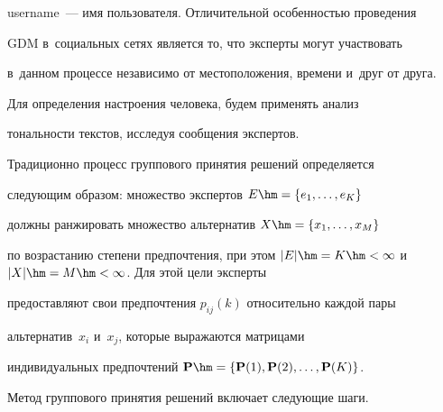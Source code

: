 username~--- имя пользователя. Отличительной осо\-бен\-ностью проведения 


GDM в~социальных сетях является то, что эксперты могут участвовать 


в~данном процессе независимо от местоположения, времени и~друг от друга.


  


  Для определения настроения человека, будем применять анализ 


тональности текстов, исследуя сообщения экспертов. 


  


  Традиционно процесс группового принятия решений определяется 


сле\-ду\-ющим образом: множество экспертов $E\hm= \{ e_1, \ldots , e_K\}$ 


должны ранжировать множество альтернатив $X\hm= \{x_1, \ldots , x_M\}$ 


по возрастанию степени предпочтения, при этом $\vert E\vert \hm= K\hm< 


\infty$ и~$\vert X\vert \hm= M\hm< \infty$. Для этой цели эксперты 


предоставляют свои предпочтения $p_{ij}(k)$ относительно каждой пары 


альтернатив~$x_i$ и~$x_j$, которые выражаются матрицами 


индивидуальных предпочтений $\mathbf{P}\hm= \{ \mathbf{P}(1), 


\mathbf{P}(2), \ldots , \mathbf{P}(K)\}$. 


  


  Метод группового принятия решений включает следующие шаги.


